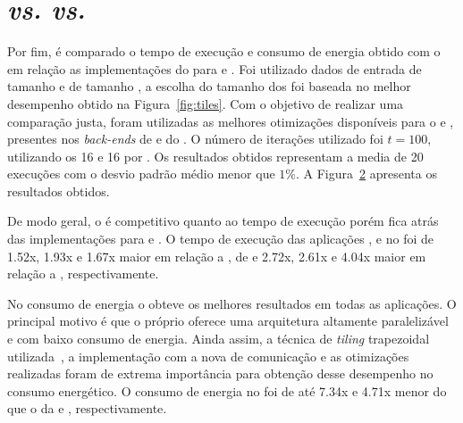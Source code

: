 \begin{figure}[t]
\begin{subfigure}{0.494\textwidth}
    \label{fig:compara-energia-async-cpu-gpu}
  \end{subfigure}
  \label{fig:async_vs_cpu_gpu}
\end{figure}

\section{\mppa \async \textit{vs.} \cpu \textit{vs.} \gpu}
\label{sec:async_vs_cpu_gpu}

Por fim, é comparado o tempo de execução e consumo de energia obtido com o \pskelmppa \async em relação as implementações do \pskel para \cpu e \gpu. Foi utilizado dados de entrada de tamanho \ind e \tiles de tamanho \tiled, a escolha do tamanho dos \tiles foi baseada no melhor desempenho obtido na Figura~\ref{fig:tiles}. Com o objetivo de realizar uma comparação justa, foram utilizadas as melhores otimizações disponíveis para o \xeon e \tesla, presentes nos \textit{back-ends} de \multicore e \gpu do \pskel. O número de iterações utilizado foi $t = 100$, utilizando os 16 \clusters e 16 \pes por \cluster. Os resultados obtidos representam a media de 20 execuções com o desvio padrão médio menor que $1\%$. A Figura~\ref{fig:async_vs_cpu_gpu} apresenta os resultados obtidos.

De modo geral, o \pskelmppa \async é competitivo quanto ao tempo de execução porém fica atrás das implementações para \cpu e \gpu. O tempo de execução das aplicações \convolution, \gol e \jacobi no \mppa foi de 1.52x, 1.93x e 1.67x maior em relação a \cpu, de  e 2.72x, 2.61x e 4.04x maior em relação a \gpu, respectivamente.

No consumo de energia o \pskelmppa \async obteve os melhores resultados em todas as aplicações. O principal motivo é que o próprio \mppa oferece uma arquitetura altamente paralelizável e com baixo consumo de energia. Ainda assim, a técnica de \textit{tiling} trapezoidal utilizada~\cite{Podesta:TCC}, a implementação com a nova \api de comunicação \async e as otimizações realizadas foram de extrema importância para obtenção desse desempenho no consumo energético. O consumo de energia no \mppa foi de até 7.34x e 4.71x menor do que o da \cpu e \gpu, respectivamente.
